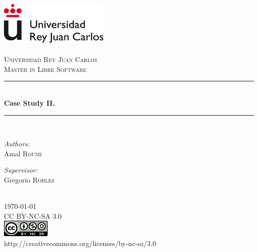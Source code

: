\documentclass[11pt]{article} %
\begin{document}
\begin{titlepage}
\newcommand{\HRule}{\rule{\linewidth}{0.5mm}} %
\center %
\includegraphics{urjc} \\[0.5cm] %
\textsc{\LARGE \\Universidad Rey Juan Carlos}\\[1cm] %
\textsc{\Large Master in Libre Software}\\[0.5cm] %
\HRule \\[1.5cm]
{ \huge \bfseries Case Study II.}\\[0.4cm] %
\HRule \\[1.5cm]
\begin{minipage}{0.4\textwidth}
\begin{flushleft} \large
\emph{Authors:}\\
Amal \textsc{Roumi}\\ %
\end{flushleft}
\end{minipage}
\begin{minipage}{0.4\textwidth}
\begin{flushright} \large
\emph{Supervisor:} \\
Gregorio  \textsc{Robles} %
\end{flushright}
\end{minipage}\\[1.5cm]
{\large \today}\\[1.8cm] %
\textsc CC BY-NC-SA 3.0\\[0.2cm]
\includegraphics[scale=0.5]{license} \\ %
{\small http://creativecommons.org/licenses/by-nc-sa/3.0}\\
\mbox{}

\end{titlepage}
\end{document}
